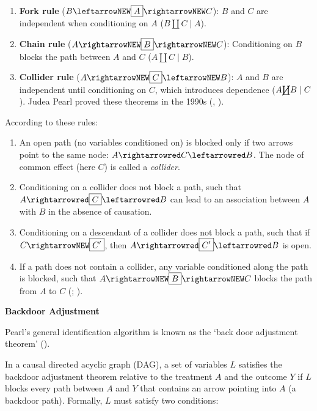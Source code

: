 \documentclass[
  single column]{article}
\providecommand{\tightlist}{%
  \setlength{\itemsep}{0pt}\setlength{\parskip}{0pt}}\usepackage{longtable,booktabs,array}
\begin{document}
\begin{enumerate}
\def\labelenumi{\arabic{enumi}.}
\tightlist
\item
  \textbf{Fork rule} (\(B \leftarrowNEW \boxed{A} \rightarrowNEW C\)):
  \(B\) and \(C\) are independent when conditioning on \(A\)
  (\(B \coprod C \mid A\)).
\item
  \textbf{Chain rule} (\(A \rightarrowNEW \boxed{B} \rightarrowNEW C\)):
  Conditioning on \(B\) blocks the path between \(A\) and \(C\)
  (\(A \coprod C \mid B\)).
\item
  \textbf{Collider rule}
  (\(A \rightarrowNEW \boxed{C} \leftarrowNEW B\)): \(A\) and \(B\) are
  independent until conditioning on \(C\), which introduces dependence
  (\(A \cancel{\coprod} B \mid C\)). Judea Pearl proved these theorems
  in the 1990s (,
  ).
\end{enumerate}

According to these rules:

\begin{enumerate}
\def\labelenumi{\arabic{enumi}.}
\tightlist
\item
  An open path (no variables conditioned on) is blocked only if two
  arrows point to the same node: \(A \rightarrowred C \leftarrowred B\).
  The node of common effect (here \(C\)) is called a \emph{collider}.
\item
  Conditioning on a collider does not block a path, such that
  \(A \rightarrowred \boxed{C} \leftarrowred B\) can lead to an
  association between \(A\) with \(B\) in the absence of causation.
\item
  Conditioning on a descendant of a collider does not block a path, such
  that if \(C \rightarrowNEW \boxed{C'}\), then
  \(A \rightarrowred \boxed{C'} \leftarrowred B\) is open.
\item
  If a path does not contain a collider, any variable conditioned along
  the path is blocked, such that
  \(A \rightarrowNEW \boxed{B} \rightarrowNEW C\) blocks the path from
  \(A\) to \(C\) (; ).
\end{enumerate}

\textbf{Backdoor Adjustment}

Pearl's general identification algorithm is known as the `back door
adjustment theorem' ().

In a causal directed acyclic graph (DAG), a set of variables \(L\)
satisfies the backdoor adjustment theorem relative to the treatment
\(A\) and the outcome \(Y\) if \(L\) blocks every path between \(A\) and
\(Y\) that contains an arrow pointing into \(A\) (a backdoor path).
Formally, \(L\) must satisfy two conditions:
\end{document}
